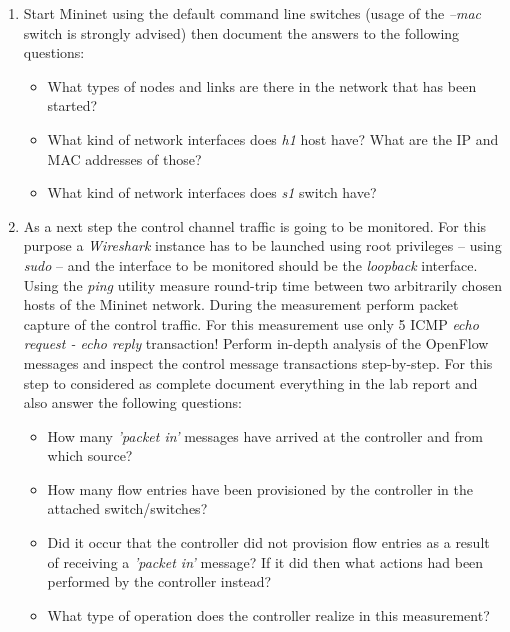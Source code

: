 \documentclass{article}
\begin{document}
\begin{enumerate}

    \item Start Mininet using the default command line switches (usage of the \emph{--mac} switch is strongly advised)
          then document the answers to the following questions:
          \begin{itemize}
              \item What types of nodes and links are there in the network that has been started?
              \item What kind of network interfaces does \emph{h1} host have? What are the IP and MAC addresses of
                    those?
              \item What kind of network interfaces does \emph{s1} switch have?
          \end{itemize}

    \item As a next step the control channel traffic is going to be monitored. For this purpose a \emph{Wireshark}
          instance
          has to be launched using root privileges -- using \emph{sudo} -- and the interface to be monitored should be
          the
          \emph{loopback} interface. Using the \emph{ping} utility measure round-trip time between two arbitrarily
          chosen hosts
          of the Mininet network. During the measurement perform packet capture of the control traffic. For this
          measurement use
          only 5 ICMP \emph{echo request - echo reply} transaction! Perform in-depth analysis of the OpenFlow messages
          and
          inspect the control message transactions step-by-step. For this step to considered as complete document
          everything in
          the lab report and also answer the following questions:
          \begin{itemize}
              \item How many \emph{'packet in'} messages have arrived at the controller and from which source?
              \item How many flow entries have been provisioned by the controller in the attached switch/switches?
              \item Did it occur that the controller did not provision flow entries as a result of receiving a
                    \emph{'packet in'}
                    message? If it did then what actions had been performed by the controller instead?
              \item What type of operation does the controller realize in this measurement?
          \end{itemize}


\end{enumerate}
\end{document}
